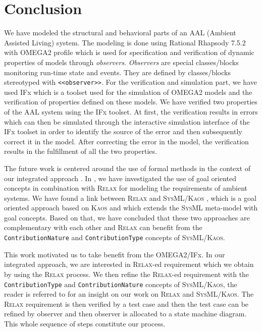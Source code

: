 \documentclass[a4paper,twoside]{article}
\def\myrelax{\textsc{Relax}}                  %
\def\sysml{\textsc{SysML}}
\def\kaos{\textsc{Kaos}}
\begin{document}
\section{Conclusion}
\label{sec:conclusion}
\noindent We have modeled the structural and behavioral parts of an AAL (Ambient Assisted Living) system. The modeling is done using Rational Rhapsody 7.5.2  with OMEGA2 profile which is used for specification and verification of dynamic properties of models through \textit{observers}. \textit{Observers} are special classes/blocks monitoring run-time state and events. They are defined by classes/blocks stereotyped with \texttt{<<observer>>}. For the verification and simulation part, we have used IFx which is a toolset used for the simulation of OMEGA2 models and the verification of properties defined on these models. We have verified two properties of the AAL system using the IFx toolset. At first, the verification results in errors which can then be simulated through the interactive simulation interface of the IFx toolset in order to identify the source of the error and then subsequently correct it in the model. After correcting the error in the model, the verification results in the fulfillment of all the two properties. 

The future work is centered around the use of formal methods in the context of our integrated approach \cite{JMBruel2009}. In \cite{MAhmad2012}, we have investigated the use of goal oriented concepts in combination with \myrelax{} for modeling the requirements of ambient systems. We have found a link between \myrelax{} and \sysml{}/\kaos{} \cite{CGnaho2010}, which is a goal oriented approach based on \kaos{} and which extends the \sysml{} meta-model with goal concepts. Based on that, we have concluded that these two approaches are complementary with each other and \myrelax{} can benefit from the \texttt{ContributionNature} and \texttt{ContributionType} concepts of \sysml{}/\kaos{}. 

This work motivated us to take benefit from the OMEGA2/IFx. In our integrated approach, we are interested in \myrelax{}-ed requirement which we obtain by using the \myrelax{} process. We then refine the \myrelax{}-ed requirement with the \texttt{ContributionType} and \texttt{ContributionNature} concepts of \sysml{}/\kaos{}, the reader is referred to \cite{MAhmad2012} for an insight on our work on \myrelax{} and \sysml{}/\kaos{}. The \myrelax{} requirement is then verified by a test case and then the test case can be refined by observer and then observer is allocated to a state machine diagram. This whole sequence of steps constitute our process.


{\small
}

%
\vfill
\end{document}
